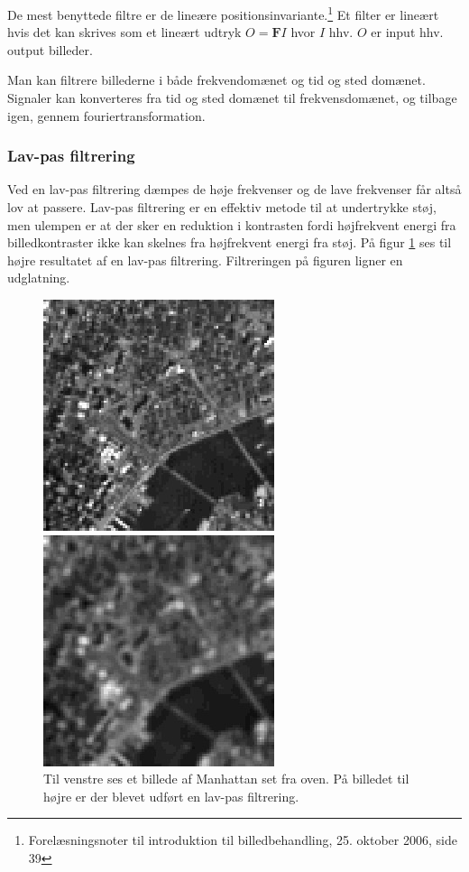 De mest benyttede filtre er de lineære positionsinvariante.\footnote{Forelæsningsnoter til introduktion til billedbehandling, 25. oktober 2006, side 39} Et filter er lineært hvis det kan skrives som et lineært udtryk $O=\mathbf{F}I$ hvor $I$ hhv. $O$ er input hhv. output billeder. 

Man kan filtrere billederne i både frekvendomænet og tid og sted domænet. Signaler kan konverteres fra tid og sted domænet til frekvensdomænet, og tilbage igen, gennem fouriertransformation.

\subsubsection{Lav-pas filtrering}
Ved en lav-pas filtrering dæmpes de høje frekvenser og de lave frekvenser får altså lov at passere. Lav-pas filtrering er en effektiv metode til at undertrykke støj, men ulempen er at der sker en reduktion i kontrasten fordi højfrekvent energi fra billedkontraster ikke kan skelnes fra højfrekvent energi fra støj. På figur \ref{fig:low_pass} ses til højre resultatet af en lav-pas filtrering. Filtreringen på figuren ligner en udglatning.
\begin{figure}[H]
	\begin{minipage}[b]{0.5\linewidth}
		\centering
		\includegraphics[scale=0.5]{files/bildbeh/img/new_york.jpg}
	\end{minipage}
	\hspace{0.5cm}
	\begin{minipage}[b]{0.5\linewidth}
		\centering
		\includegraphics[scale=0.5]{files/bildbeh/img/lowpass.jpg}
	\end{minipage}
	\caption{Til venstre ses et billede af Manhattan set fra oven. På billedet til højre er der blevet udført en lav-pas filtrering.\label{fig:low_pass}}
\end{figure}


